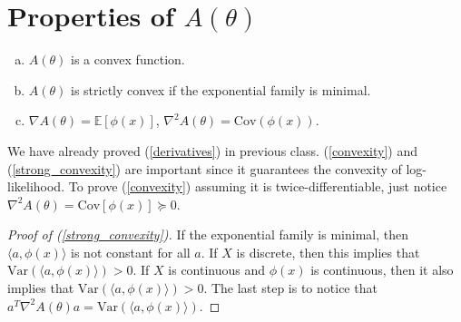 \documentclass[11pt]{article}
\newcommand{\E}{\mathbb{E}}
\newcommand{\1}{\mathbbm{1}}
\begin{document}
\section{Properties of $A(\theta)$}
\begin{enumerate}[(a)]
\item \label{convexity}
$A(\theta)$ is a convex function.
\item \label{strong_convexity}
$A(\theta)$ is strictly convex if the exponential family is minimal.
\item \label{derivatives}
$\nabla A(\theta) = \E[\phi(x)]$, $\nabla^2 A(\theta) = \mathrm{Cov} (\phi(x))$.
\end{enumerate}
We have already proved (\ref{derivatives}) in previous class. (\ref{convexity}) and (\ref{strong_convexity})
are important since it guarantees the convexity of log-likelihood. To prove (\ref{convexity}) assuming
it is twice-differentiable, just notice $\nabla^2 A(\theta) = \mathrm{Cov} [\phi(x)] \succeq 0$.
\begin{proof}[Proof of (\ref{strong_convexity})]
If the exponential family is minimal, then $\langle a, \phi(x) \rangle$ is not constant for all $a$. If $X$
is discrete, then this implies that $\mathrm{Var} (\langle a, \phi(x) \rangle) > 0$. If $X$ is continuous and
$\phi(x)$ is continuous, then it also implies that $\mathrm{Var} (\langle a, \phi(x) \rangle) > 0$. The last
step is to notice that $a^T \nabla^2 A(\theta) a = \mathrm{Var}(\langle a, \phi(x) \rangle)$.
\end{proof}
\end{document}
